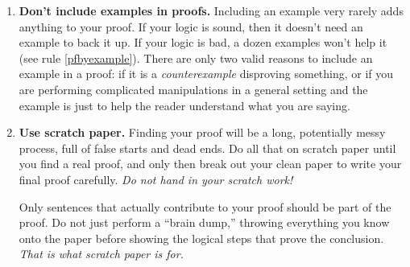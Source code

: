\documentclass[11pt]{article}
\begin{document}
\begin{enumerate}
\item \textbf{Don't include examples in proofs.}
        Including an example very rarely adds anything to your proof.
        If your logic is sound, then it doesn't need an example to back it up.
        If your logic is bad, a dozen examples won't help it (see rule \ref{pfbyexample}).
        There are only two valid reasons to include an example in a proof:
        if it is a \emph{counterexample} disproving something,
        or if you are performing complicated manipulations in a general setting
        and the example is just to help the reader understand what you are saying.

 \item \textbf{Use scratch paper.}
        Finding your proof will be a long, potentially messy process, 
        full of false starts and dead ends.
        Do all that on scratch paper
        until you find a real proof,
        and only then break out your clean paper to write your final proof carefully.
        \emph{Do not hand in your scratch work!}
        
        Only sentences that actually contribute to your proof 
        should be part of the proof.
        Do not just perform a ``brain dump,''
        throwing everything you know onto the paper
        before showing the logical steps that prove the conclusion.
        \emph{That is what scratch paper is for.}

\end{enumerate}
\end{document}
